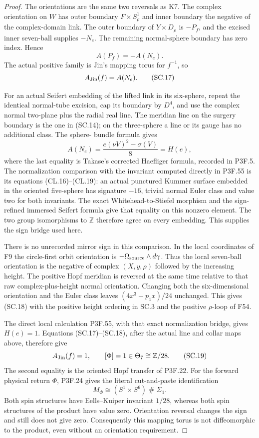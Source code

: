 \begin{proof}
The orientations are the same two reversals as K7. The complex
orientation on \(W\) has outer boundary \(F\times S^1_\rho\) and
inner boundary the negative of the complex-domain link. The outer
boundary of \(Y\times D_\rho\) is \(-P_f\), and the excised inner
seven-ball supplies \(-N_e\). The remaining normal-sphere boundary
has zero index. Hence
\[
                         A(P_f)=-A(N_e).
\]
The actual positive family is Jin's mapping torus for \(f^{-1}\), so
\[
                         A_{\rm Jin}(f)=A(N_e).      \tag{SC.17}
\]

For an actual Seifert embedding of the lifted link in its six-sphere,
repeat the identical normal-tube excision, cap its boundary by \(D^4\),
and use the complex normal two-plane plus the radial real line. The
meridian line on the surgery boundary is the one in (SC.14); on the
three-sphere a line or its gauge has no additional class. The sphere-
bundle formula gives
\[
 A(N_e)=\frac{e(\nu V)^2-\sigma(V)}8
                      =H(e),                        \tag{SC.18}
\]
where the last equality is Takase's corrected Haefliger formula,
recorded in P3F.5. The normalization comparison with the invariant
computed directly in P3F.55 is its equations (CL.16)--(CL.19): an
actual punctured Kummer surface embedded in the oriented five-sphere
has signature \(-16\), trivial normal Euler class and value two
for both invariants. The exact Whitehead-to-Stiefel morphism and the
sign-refined immersed Seifert formula give that equality on this
nonzero element. The two group isomorphisms to \(\mathbb Z\)
therefore agree on every embedding. This supplies the sign bridge
used here.

There is no unrecorded mirror sign in this comparison. In the local
coordinates of F9 the circle-first orbit orientation is
\(-\Omega_{\rm source}\wedge d\gamma\). Thus the local seven-ball
orientation is the negative of complex \((X,y,\rho)\) followed by the
increasing height. The positive Hopf meridian is reversed at the same
time relative to that raw complex-plus-height normal orientation.
Changing both the six-dimensional orientation and the Euler class
leaves \((4x^3-p_1x)/24\) unchanged. This gives (SC.18) with the
positive height ordering in SC.3 and the positive \(\rho\)-loop of
F54.

The direct local calculation P3F.55, with that exact normalization
bridge, gives \(H(e)=1\). Equations (SC.17)--(SC.18), after the actual
line and collar maps above, therefore give
\[
 A_{\rm Jin}(f)=1,\qquad [\Phi]=1\in\Theta_7\cong\mathbb Z/28.
                                                               \tag{SC.19}
\]
The second equality is the oriented Hopf transfer of P3F.22. For the
forward physical return \(\Phi\), P3F.24 gives the literal cut-and-paste
identification
\[
 M_\Phi\cong(S^1\times S^6)\mathbin{\#}\Sigma_1.
                                                               \tag{SC.20}
\]
Both spin structures have Eells--Kuiper invariant \(1/28\), whereas
both spin structures of the product have value zero. Orientation
reversal changes the sign and still does not give zero. Consequently
this mapping torus is not diffeomorphic to the product, even without
an orientation requirement.


\end{proof}
